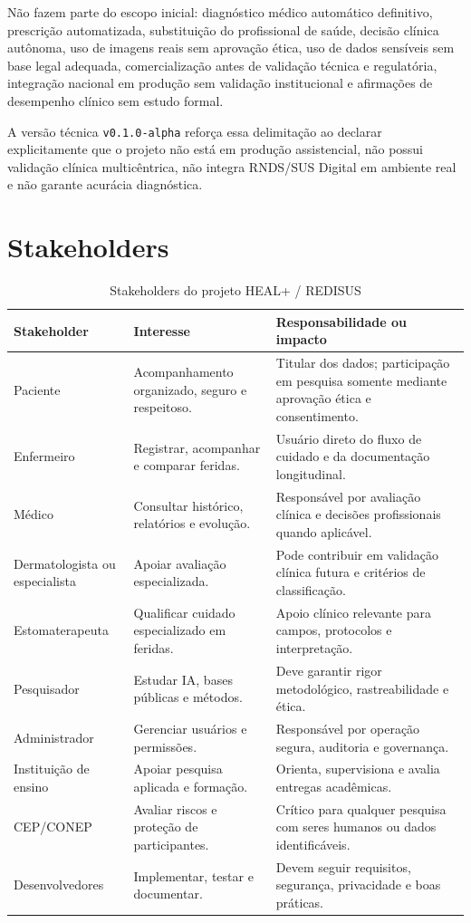 \documentclass[
    12pt,
    oneside,
    a4paper,
    chapter=TITLE,
    brazil,
    sumario=tradicional,
    hidelinks
]{abntex2}
\begin{document}
Não fazem parte do escopo inicial: diagnóstico médico automático definitivo, prescrição automatizada, substituição do profissional de saúde, decisão clínica autônoma, uso de imagens reais sem aprovação ética, uso de dados sensíveis sem base legal adequada, comercialização antes de validação técnica e regulatória, integração nacional em produção sem validação institucional e afirmações de desempenho clínico sem estudo formal.

A versão técnica \texttt{v0.1.0-alpha} reforça essa delimitação ao declarar explicitamente que o projeto não está em produção assistencial, não possui validação clínica multicêntrica, não integra RNDS/SUS Digital em ambiente real e não garante acurácia diagnóstica.

\chapter{Stakeholders}

\begin{table}[htbp]
    \centering
    \caption{\label{tab:stakeholders}Stakeholders do projeto HEAL+ / REDISUS}
    \begin{tabular}{L{3.2cm}L{4.2cm}L{5.8cm}}
        \toprule
        \textbf{Stakeholder} & \textbf{Interesse} & \textbf{Responsabilidade ou impacto} \\
        \midrule
        Paciente & Acompanhamento organizado, seguro e respeitoso. & Titular dos dados; participação em pesquisa somente mediante aprovação ética e consentimento. \\
        Enfermeiro & Registrar, acompanhar e comparar feridas. & Usuário direto do fluxo de cuidado e da documentação longitudinal. \\
        Médico & Consultar histórico, relatórios e evolução. & Responsável por avaliação clínica e decisões profissionais quando aplicável. \\
        Dermatologista ou especialista & Apoiar avaliação especializada. & Pode contribuir em validação clínica futura e critérios de classificação. \\
        Estomaterapeuta & Qualificar cuidado especializado em feridas. & Apoio clínico relevante para campos, protocolos e interpretação. \\
        Pesquisador & Estudar IA, bases públicas e métodos. & Deve garantir rigor metodológico, rastreabilidade e ética. \\
        Administrador & Gerenciar usuários e permissões. & Responsável por operação segura, auditoria e governança. \\
        Instituição de ensino & Apoiar pesquisa aplicada e formação. & Orienta, supervisiona e avalia entregas acadêmicas. \\
        CEP/CONEP & Avaliar riscos e proteção de participantes. & Crítico para qualquer pesquisa com seres humanos ou dados identificáveis. \\
        Desenvolvedores & Implementar, testar e documentar. & Devem seguir requisitos, segurança, privacidade e boas práticas. \\
        \bottomrule
    \end{tabular}
\end{table}
\end{document}
